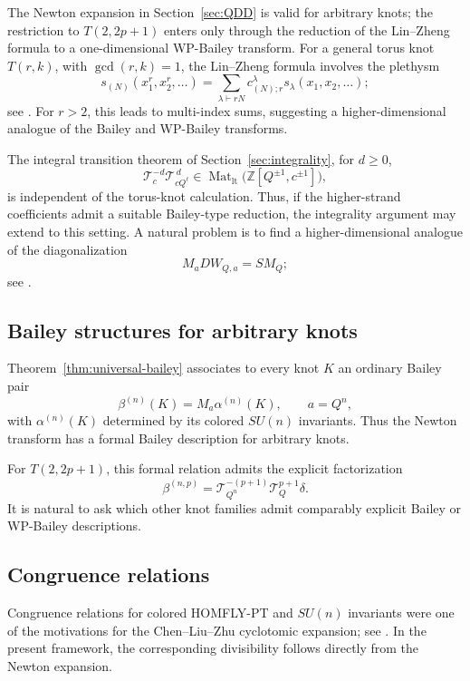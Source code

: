 \documentclass[11pt]{amsart}
\newcommand{\Z}{\mathbb Z}
\begin{document}
The Newton expansion in Section~\ref{sec:QDD} is valid for arbitrary
knots; the restriction to \(T(2,2p+1)\) enters only through the
reduction of the Lin--Zheng formula to a one-dimensional WP-Bailey
transform.  For a general torus knot \(T(r,k)\), with \(\gcd(r,k)=1\),
the Lin--Zheng formula involves the plethysm
\[
s_{(N)}(x_1^r,x_2^r,\ldots)
=
\sum_{\lambda\vdash rN}
c_{(N);r}^{\lambda}s_\lambda(x_1,x_2,\ldots);
\]
see \cite{LinZheng}.  For \(r>2\), this leads to multi-index sums,
suggesting a higher-dimensional analogue of the Bailey and WP-Bailey
transforms.

The integral transition theorem of Section~\ref{sec:integrality}, for \(d\geq0\),
\[
\mathcal T_c^{-d}\mathcal T_{cQ^\ell}^{\,d}
\in
\operatorname{Mat}_{\mathrm{lt}}
\bigl(\Z[Q^{\pm1},c^{\pm1}]\bigr),
\]
is independent of the torus-knot calculation.  Thus, if the
higher-strand coefficients admit a suitable Bailey-type reduction,
the integrality argument may extend to this setting.  A natural
problem is to find a higher-dimensional analogue of the
diagonalization
\[
M_aD W_{Q,a}=S M_Q;
\]
see \cite{AndrewsBerkovich,McLaughlin,Warnaar}.


\subsection{Bailey structures for arbitrary knots}

Theorem~\ref{thm:universal-bailey} associates to every knot \(K\) an
ordinary Bailey pair
\[
\beta^{(n)}(K)=M_a\alpha^{(n)}(K),
\qquad a=Q^n,
\]
with \(\alpha^{(n)}(K)\) determined by its colored \(SU(n)\) invariants.
Thus the Newton transform has a formal Bailey description for arbitrary
knots.

For \(T(2,2p+1)\), this formal relation admits the explicit factorization
\[
\beta^{(n,p)}
=
\mathcal T_{Q^n}^{-(p+1)}
\mathcal T_Q^{p+1}\delta.
\]
It is natural to ask which other knot families admit comparably explicit
Bailey or WP-Bailey descriptions.


\subsection{Congruence relations}

Congruence relations for colored HOMFLY-PT and \(SU(n)\) invariants
were one of the motivations for the Chen--Liu--Zhu cyclotomic
expansion; see \cite{CLPZ,CLZ,ZhuStructures}.  In the present
framework, the corresponding divisibility follows directly from the
Newton expansion.
\end{document}
